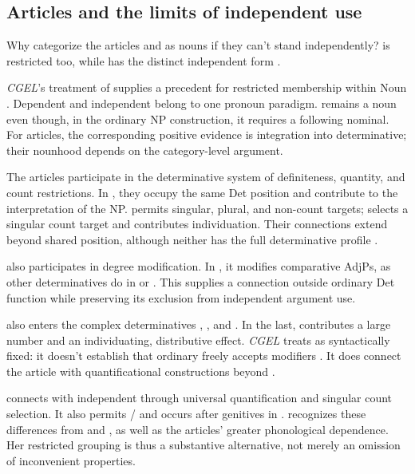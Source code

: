 \documentclass[12pt]{article}
\begin{document}
\subsection{Articles and the limits of independent use}

Why categorize the articles  and  as nouns if they can't stand independently?  is restricted too, while  has the distinct independent form  \citep[371--372, 410--411]{huddleston2002}.

\textit{CGEL}'s treatment of  supplies a precedent for restricted membership within Noun \citep[470--471]{huddleston2002}. Dependent  and independent  belong to one pronoun paradigm.  remains a noun even though, in the ordinary NP construction, it requires a following nominal. For articles, the corresponding positive evidence is integration into determinative; their nounhood depends on the category-level argument.

The articles participate in the determinative system of definiteness, quantity, and count restrictions. In , they occupy the same Det position and contribute to the interpretation of the NP.  permits singular, plural, and non-count targets;  selects a singular count target and contributes individuation. Their connections extend beyond shared position, although neither has the full determinative profile \citep[368--373]{huddleston2002}.

 also participates in degree modification. In , it modifies comparative AdjPs, as other determinatives do in  or  \citep[1131--1132, 1135--1136]{huddleston2002}. This supplies a connection outside ordinary Det function while preserving its exclusion from independent argument use.

 also enters the complex determinatives , , and . In the last,  contributes a large number and  an individuating, distributive effect. \textit{CGEL} treats  as syntactically fixed: it doesn't establish that ordinary  freely accepts modifiers \citep[392--394]{huddleston2002}. It does connect the article with quantificational constructions beyond .

 connects with independent  through universal quantification and singular count selection. It also permits / and occurs after genitives in . \textcite[156--158]{spinillo2004reconceptualising} recognizes these differences from  and , as well as the articles' greater phonological dependence. Her restricted grouping is thus a substantive alternative, not merely an omission of inconvenient properties.
\end{document}
